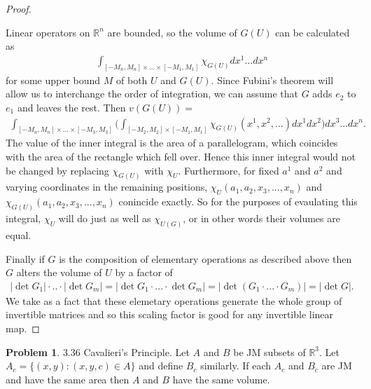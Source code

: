 \documentclass[20pt]{article}
\theoremstyle{plain}
\theoremstyle{definition}
\newtheorem*{problem}{Problem}
\newcommand{\reals}{\mathbb{R}}
\begin{document}
\begin{proof}
\begin{enumerate}
     Linear operators on $\mathbb{R}^n$ are bounded, so the volume of $G(U)$
     can be calculated as 
     \begin{align*}
       \int_{[-M_n, M_n]\times...\times [-M_1,M_1]}\chi_{G(U)}dx^1...dx^n
     \end{align*}
     for some upper bound $M$ of both $U$ and $G(U)$.  Since Fubini's theorem will allow us to interchange
     the order of integration, we can assume that $G$ 
     adds $e_2$ to $e_1$ and leaves the rest. Then $v(G(U)) = $
     \begin{align*}
       \int_{[-M_n, M_n]\times...\times[-M_3, M_3]} \bigg( 
          \int_{[-M_2,M_2]\times[-M_1,M_1]} \chi_{G(U)}(x^1, x^2, ...)dx^1dx^2
        \bigg) dx^3...dx^n.
     \end{align*}
     The value of the inner integral is the area of a parallelogram, which 
     coincides with the area of the rectangle which fell over.  Hence this inner integral 
     would not be changed by replacing $\chi_{G(U)}$ with $\chi_U.$
     Furthermore, for fixed $a^1$ and $a^2$ and varying coordinates in the 
     remaining positions, $\chi_U(a_1, a_2, x_3, ..., x_n)$ and 
     $\chi_{G(U)}(a_1, a_2, x_3, ..., x_n)$ conincide exactly.
     So for the purposes of evaulating this integral, $\chi_U$ will do 
     just as well as $\chi_{U(G)}$, or in other words their volumes are equal.
     
     \end{enumerate}

     Finally if $G$ is the composition of elementary operations as described above
     then $G$ alters the volume of $U$ by a factor of 
     \begin{align*}
        |\det G_1| \cdot .. \cdot |\det G_m| = 
        |\det G_1 \cdot ... \cdot \det G_m | = 
        |\det (G_1 \cdot ... \cdot G_m) | = |\det G|.
     \end{align*}
     We take as a fact that these elemetary operations generate the whole group 
     of invertible matrices and so this scaling factor is good for any invertible linear map.
\end{proof}




\begin{problem}{3.36 Cavalieri's Principle.}
    Let $A$ and $B$ be JM subsets of $\reals^3$. 
    Let $A_c = \{(x, y): (x, y, c) \in A\}$ and define $B_c$ similarly.
    If each $A_c$ and $B_c$ are JM  and have the same area then $A$ and $B$
    have the same volume.
\end{problem}
\end{document}
